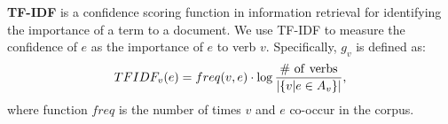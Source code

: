 \textbf{TF-IDF} is a confidence scoring function in information
retrieval for identifying the importance of a term to a document.
We use TF-IDF to measure the confidence of $e$ as the importance
of $e$ to verb $v$. Specifically, $g_v$ is defined as:
\begin{equation}
TFIDF_v(e) = freq(v,e)\cdot \log\frac{\rm{\#\ of\ verbs}}{|\{v|e\in A_v\}|},
\end{equation}
where function $freq$ is the number of times $v$ and $e$ co-occur
in the corpus.


